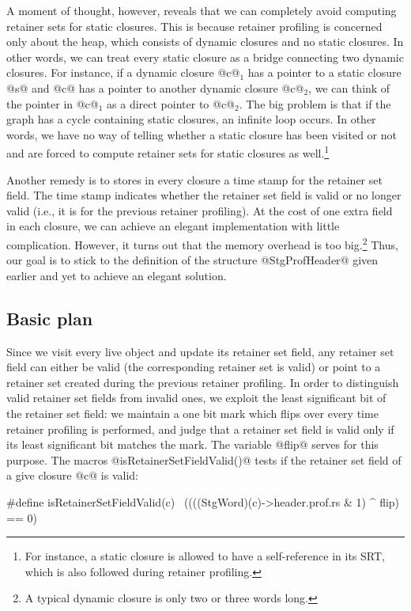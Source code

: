 \documentclass{article}
\begin{document}
A moment of thought, however, reveals that we can completely avoid computing 
retainer sets for static closures. This is because retainer profiling is 
concerned only about the heap, which consists of dynamic closures and no
static closures. In other words, we can treat every static closure as
a bridge connecting two dynamic closures. 
For instance, if a dynamic closure @c@$_1$ has a pointer to a static
closure @s@ and @c@ has a pointer to another dynamic closure @c@$_2$,
we can think of the pointer in @c@$_1$ as a direct pointer to @c@$_2$.
The big problem is that if the graph has a cycle containing static closures,
an infinite loop occurs. In other words, we have no way of telling whether
a static closure has been visited or not and are forced to compute
retainer sets for static closures as well.\footnote{For instance, 
a static closure is allowed to have a self-reference in its SRT, which
is also followed during retainer profiling.}

Another remedy is to stores in every closure a time stamp for the
retainer set field. The time stamp indicates whether the retainer
set field is valid or no longer valid (i.e., it is for the previous
retainer profiling). 
At the cost of one extra field in each closure, we can achieve an
elegant implementation with little complication.
However, it turns out that the memory overhead is too big.\footnote{A typical
dynamic closure is only two or three words long.}
Thus, our goal is to stick to the definition of the structure @StgProfHeader@
given earlier and yet to achieve an elegant solution.

\subsection{Basic plan}

Since we visit every live object and update its retainer set field,
any retainer set field can either be valid (the corresponding retainer
set is valid) or point to a retainer set created during the previous
retainer profiling. 
In order to distinguish valid retainer set fields
from invalid ones, we exploit the least significant bit of the retainer
set field: we maintain a one bit mark which flips over every time
retainer profiling is performed, and judge that a retainer set field is
valid only if its least significant bit matches the mark.
The variable @flip@ serves for this purpose. 
The macros @isRetainerSetFieldValid()@ tests if the retainer set field
of a give closure @c@ is valid:

\begin{code}
#define isRetainerSetFieldValid(c) \
  ((((StgWord)(c)->header.prof.rs & 1) ^ flip) == 0)
\end{code}
\end{document}
